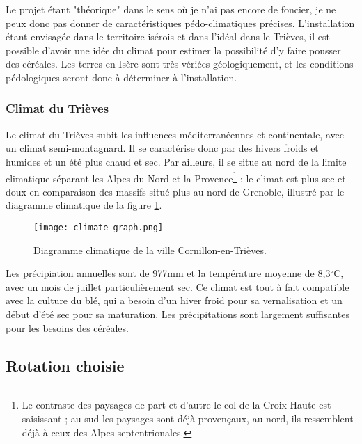 \documentclass{book}
\begin{document}
Le projet étant "théorique" dans le sens où je n'ai pas encore de foncier, je ne peux donc pas donner de caractéristiques pédo-climatiques précises. L'installation étant envisagée dans le territoire isérois et dans l'idéal dans le Trièves, il est possible d'avoir une idée du climat pour estimer la possibilité d'y faire pousser des céréales. Les terres en Isère sont très vériées géologiquement, et les conditions pédologiques seront donc à déterminer à l'installation.

\subsubsection{Climat du Trièves}

Le climat du Trièves subit les influences méditerranéennes et continentale, avec un climat semi-montagnard. Il se caractérise donc par des hivers froids et humides et un été plus chaud et sec. Par ailleurs, il se situe au nord de la limite climatique séparant les Alpes du Nord et la Provence\footnote{Le contraste des paysages de part et d'autre le col de la Croix Haute est saisissant ; au sud les paysages sont déjà provençaux, au nord, ils ressemblent déjà à ceux des Alpes septentrionales.} ; le climat est plus sec et doux en comparaison des massifs situé plus au nord de Grenoble, illustré par le diagramme climatique de la figure \ref{fig:climat}.

\begin{figure}[h!]
\begin{center}
	\texttt{[image: climate-graph.png]}
	\caption{Diagramme climatique de la ville Cornillon-en-Trièves.}
	\label{fig:climat}
\end{center}
\end{figure}

Les précipiation annuelles sont de 977mm et la température moyenne de 8,3$^\circ$C, avec un mois de juillet particulièrement sec. Ce climat est tout à fait compatible avec la culture du blé, qui a besoin d'un hiver froid pour sa vernalisation et un début d'été sec pour sa maturation. Les précipitations sont largement suffisantes pour les besoins des céréales.

\subsection{Rotation choisie}
\end{document}
